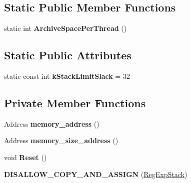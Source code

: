 \subsection*{Static Public Member Functions}
\begin{DoxyCompactItemize}
\item 
static int {\bfseries Archive\+Space\+Per\+Thread} ()\hypertarget{classv8_1_1internal_1_1_reg_exp_stack_aee574d88604a5759319c17356a2202f4}{}\label{classv8_1_1internal_1_1_reg_exp_stack_aee574d88604a5759319c17356a2202f4}

\end{DoxyCompactItemize}
\subsection*{Static Public Attributes}
\begin{DoxyCompactItemize}
\item 
static const int {\bfseries k\+Stack\+Limit\+Slack} = 32\hypertarget{classv8_1_1internal_1_1_reg_exp_stack_a204fe3ec05de664a5b0d89cb4150f069}{}\label{classv8_1_1internal_1_1_reg_exp_stack_a204fe3ec05de664a5b0d89cb4150f069}

\end{DoxyCompactItemize}
\subsection*{Private Member Functions}
\begin{DoxyCompactItemize}
\item 
Address {\bfseries memory\+\_\+address} ()\hypertarget{classv8_1_1internal_1_1_reg_exp_stack_a6af015e0d956ac74434621716697e719}{}\label{classv8_1_1internal_1_1_reg_exp_stack_a6af015e0d956ac74434621716697e719}

\item 
Address {\bfseries memory\+\_\+size\+\_\+address} ()\hypertarget{classv8_1_1internal_1_1_reg_exp_stack_a450c7d7928466379276d2d7b4cabd79e}{}\label{classv8_1_1internal_1_1_reg_exp_stack_a450c7d7928466379276d2d7b4cabd79e}

\item 
void {\bfseries Reset} ()\hypertarget{classv8_1_1internal_1_1_reg_exp_stack_a561e8df978b5e2b3e834f69beb937573}{}\label{classv8_1_1internal_1_1_reg_exp_stack_a561e8df978b5e2b3e834f69beb937573}

\item 
{\bfseries D\+I\+S\+A\+L\+L\+O\+W\+\_\+\+C\+O\+P\+Y\+\_\+\+A\+N\+D\+\_\+\+A\+S\+S\+I\+GN} (\hyperlink{classv8_1_1internal_1_1_reg_exp_stack}{Reg\+Exp\+Stack})\hypertarget{classv8_1_1internal_1_1_reg_exp_stack_a078b76aebecce74dbd25ae497f5546cb}{}\label{classv8_1_1internal_1_1_reg_exp_stack_a078b76aebecce74dbd25ae497f5546cb}

\end{DoxyCompactItemize}

